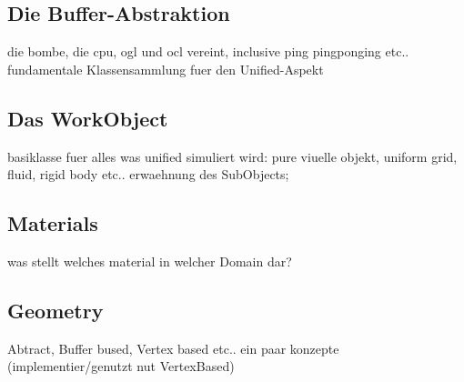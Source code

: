     	
\subsection{Die Buffer-Abstraktion}   	
 	die bombe, die cpu, ogl und ocl vereint, inclusive ping pingponging etc.. fundamentale Klassensammlung fuer den Unified-Aspekt
 
\subsection{Das WorkObject}
	basiklasse fuer alles was unified simuliert wird: pure viuelle objekt, uniform grid, fluid, rigid body etc..
	erwaehnung des SubObjects;  
 
\subsection{Materials}  
	was stellt welches material in welcher Domain dar?
	
\subsection{Geometry}
	Abtract, Buffer bused, Vertex based etc.. ein paar konzepte (implementier/genutzt nut VertexBased)  
	
	  	
  	

\clearpage
